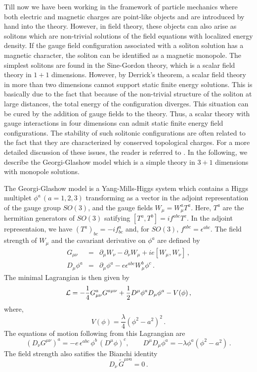 Till now we have been working in the framework of particle mechanics
where both electric and magnetic charges are point-like objects and
are introduced by hand into the theory. However, in field theory,
these objects can also arise as solitons which are non-trivial
solutions of the field equations with localized energy density. If the
gauge field configuration associated with a soliton solution has a
magnetic character, the soliton can be identified as a magnetic
monopole. The simplest solitons are found in the Sine-Gordon theory,
which is a scalar field theory in $1+1$ dimensions. However, by
Derrick's theorem, a scalar field theory in more than two dimensions
cannot support static finite energy solutions. This is basically due
to the fact that because of the non-trivial structure of the soliton
at large distances, the total energy of the configuration
diverges. This situation can be cured by the addition of gauge fields
to the theory. Thus, a scalar theory with gauge interactions in four 
dimensions can admit static finite energy field configurations. The
stability of such solitonic configurations are often related to the
fact that they are characterized by conserved topological charges. 
For a more detailed discussion of these issues, the reader is referred
to \cite{GO, coleman1, coleman2}. In the following, we describe the
Georgi-Glashow model which is a simple theory in $3+1$ dimensions with
monopole solutions.  

The Georgi-Glashow model is a Yang-Mills-Higgs system which contains 
a Higgs multiplet $\phi^a\,(a=1,2,3)$ transforming as a vector in the
adjoint representation of the gauge group $SO(3)$, and the gauge
fields $W_\mu=W^a_\mu T^a$. Here, $T^a$ are the hermitian generators
of $SO(3)$ satifying $[T^a,T^b]=if^{abc}T^c$. In the adjoint
representaion, we have $(T^a)_{bc}=-if^a_{bc}$ and, for $SO(3)$,
$f^{abc}=\epsilon^{abc}$. The field strength of $W_\mu$ and the
cavariant derivative on $\phi^a$ are defined by 
\begin{eqnarray}
G_{\mu \nu} &=& \partial_{\mu}W_{\nu} - \partial_{\nu} W_{\mu} +
ie [W_{\mu},W_{\nu}]\,,
\nonumber\\
D_\mu\phi^a &=& \partial_\mu\phi^a - e\epsilon^{abc} W^b_\mu \phi^c\,.
\end{eqnarray}
The minimal Lagrangian is then given by
\begin{equation}
{\cal L}  =  - \frac{1}{4} G^{a}_{\mu \nu} G^{a \mu \nu} +
\frac{1}{2} D^{\mu}\phi^a D_{\mu}\phi^a - V(\phi)\,,
\label{GGmodel}
\end{equation}
where,
\begin{equation}
V(\phi)=\frac{\lambda}{4}\left(\phi^2 - a^2 \right)^2\,.
\label{GGpot}
\end{equation}
The equations of motion following from this Lagrangian are 
\begin{equation}
(D_\nu G^{\mu \nu})^a=-e\,\epsilon^{abc}\,\phi^b\,(D^\mu\phi)^c,
\qquad D^\mu D_\mu \phi^a =-\lambda\phi^a (\phi^{2} - a^{2})\,. 
\label{XXIX}
\end{equation}
The field strength also satifies the Bianchi identity 
\begin{equation}
D_\nu\,\widetilde G^{\mu \nu a} = 0\,.
\label{bianchi}
\end{equation}

